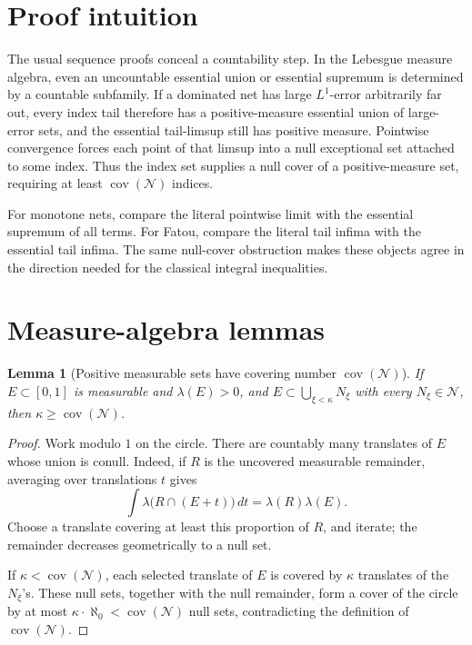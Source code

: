 \documentclass[11pt]{article}
\newtheorem{lemma}[theorem]{Lemma}
\theoremstyle{remark}
\newcommand{\cN}{\mathcal N}
\newcommand{\covN}{\operatorname{cov}(\mathcal N)}
\begin{document}
\section{Proof intuition}

The usual sequence proofs conceal a countability step.  In the Lebesgue
measure algebra, even an uncountable essential union or essential supremum is
determined by a countable subfamily.  If a dominated net has large
\(L^1\)-error arbitrarily far out, every index tail therefore has a
positive-measure essential union of large-error sets, and the essential
tail-limsup still has positive measure.  Pointwise convergence forces each
point of that limsup into a null exceptional set attached to some index.
Thus the index set supplies a null cover of a positive-measure set, requiring
at least \(\covN\) indices.

For monotone nets, compare the literal pointwise limit with the essential
supremum of all terms.  For Fatou, compare the literal tail infima with the
essential tail infima.  The same null-cover obstruction makes these objects
agree in the direction needed for the classical integral inequalities.

\section{Measure-algebra lemmas}

\begin{lemma}[Positive measurable sets have covering number \(\covN\)]
\label{lem:positive-cover}
If \(E\subset[0,1]\) is measurable and \(\lambda(E)>0\), and
\(E\subset\bigcup_{\xi<\kappa}N_\xi\) with every \(N_\xi\in\cN\), then
\(\kappa\ge\covN\).
\end{lemma}

\begin{proof}
Work modulo \(1\) on the circle.  There are countably many translates of
\(E\) whose union is conull.  Indeed, if \(R\) is the uncovered measurable
remainder, averaging over translations \(t\) gives
\[
 \int \lambda\bigl(R\cap(E+t)\bigr)\,dt
       =\lambda(R)\lambda(E).
\]
Choose a translate covering at least this proportion of \(R\), and iterate;
the remainder decreases geometrically to a null set.

If \(\kappa<\covN\), each selected translate of \(E\) is covered by
\(\kappa\) translates of the \(N_\xi\)'s.  These null sets, together with
the null remainder, form a cover of the circle by at most
\(\kappa\cdot\aleph_0<\covN\) null sets, contradicting the definition of
\(\covN\).
\end{proof}
\end{document}

